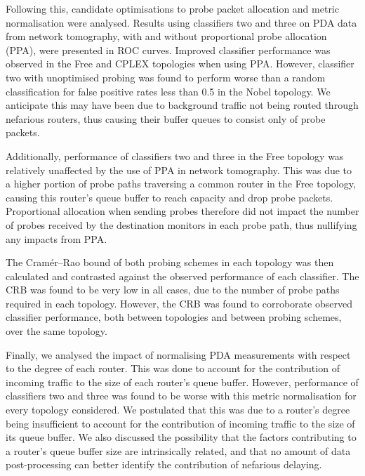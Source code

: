 Following this, candidate optimisations to probe packet allocation and metric normalisation were analysed. Results using classifiers two and three on PDA data from network tomography, with and without proportional probe allocation (PPA), were presented in ROC curves. Improved classifier performance was observed in the Free and CPLEX topologies when using PPA. However, classifier two with unoptimised probing was found to perform worse than a random classification for false positive rates less than 0.5 in the Nobel topology. We anticipate this may have been due to background traffic not being routed through nefarious routers, thus causing their buffer queues to consist only of probe packets.\par
Additionally, performance of classifiers two and three in the Free topology was relatively unaffected by the use of PPA in network tomography. This was due to a higher portion of probe paths traversing a common router in the Free topology, causing this router's queue buffer to reach capacity and drop probe packets. Proportional allocation when sending probes therefore did not impact the number of probes received by the destination monitors in each probe path, thus nullifying any impacts from PPA.\par
The Cramér–Rao bound of both probing schemes in each topology was then calculated and contrasted against the observed performance of each classifier. The CRB was found to be very low in all cases, due to the number of probe paths required in each topology. However, the CRB was found to corroborate observed classifier performance, both between topologies and between probing schemes, over the same topology.\par
Finally, we analysed the impact of normalising PDA measurements with respect to the degree of each router. This was done to account for the contribution of incoming traffic to the size of each router's queue buffer. However, performance of classifiers two and three was found to be worse with this metric normalisation for every topology considered. We postulated that this was due to a router's degree being insufficient to account for the contribution of incoming traffic to the size of its queue buffer. We also discussed the possibility that the factors contributing to a router's queue buffer size are intrinsically related, and that no amount of data post-processing can better identify the contribution of nefarious delaying.
